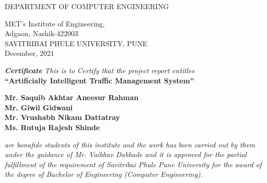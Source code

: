 \documentclass[openany,12pt]{report}
\begin{document}
\begin{titlepage}
\begin{center}
{\small DEPARTMENT OF COMPUTER ENGINEERING}\\
\begin{figure}[h]
\centerline{}
\label{atcres}
\end{figure}
{\large MET's Institute of Engineering,}\\
{\small Adgaon, Nashik-422003}\\
SAVITRIBAI PHULE UNIVERSITY, PUNE\\
\vspace{0.2in}
{\small December, 2021}
\end{center}
\end{titlepage}

\fontsize{14}{16}
\thispagestyle{empty}
\begin{center}
\begin{figure}[h]
\centerline{}
\label{atcres}
\end{figure}
\vspace{0.1in}
{\it \Huge  \textbf{Certificate}}
\vspace{0.2in}
{\it This is to Certify that the project report entitles}\\
\vspace{0.2in}
{\Large \bf ``Artificially Intelligent Traffic Management System''}\\
\vspace{0.2in}

{\bf Mr. Saquib Akhtar Aneesur Rahman}\hspace*{\fill}{\bf (Div - B Roll No. 03)}\\
{\bf Mr. Giwil Gidwani  }\hspace*{\fill}{\bf (Div - A Roll No. 24)}\\
{\bf Mr. Vrushabh Nikam Dattatray     }\hspace*{\fill}{\bf (Div - B Roll No. 50)}\\
{\bf Ms. Rutuja Rajesh Shinde    }\hspace*{\fill}{\bf (Div - B Roll No. 46)}\\
\end{center}
\vspace{0.3in}
{\it are bonafide students of this institute and the work has been carried out by them under
the guidance of Mr. Vaibhav Dabhade and it is approved for the partial fulfillment of the
requirement of Savitribai Phule Pune University for the award of the degree of Bachelor
of Engineering (Computer Engineering).}\\
\vspace{0.2in}
\vspace{0.7in}
\noindent
\end{document}
